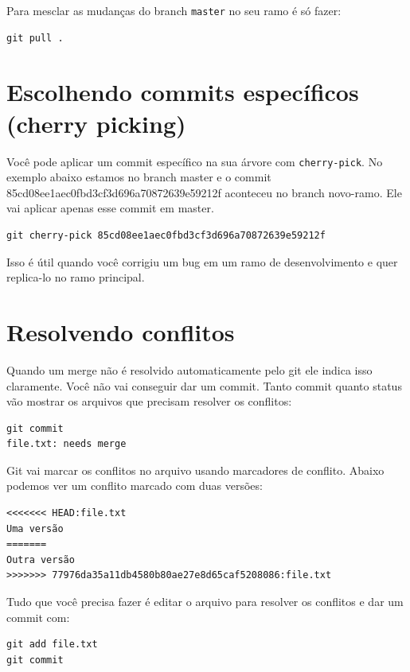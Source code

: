 \documentclass[12pt,brazil]{book}
\begin{document}
Para mesclar as mudanças do branch \texttt{master} no seu ramo é só
fazer:

\begin{verbatim}
git pull .
\end{verbatim}

\section{Escolhendo commits específicos (cherry picking)}
\label{sec:escolh-comm-espec}

Você pode aplicar um commit específico na sua árvore com
\texttt{cherry-pick}. No exemplo abaixo estamos no branch master e o
commit 85cd08ee1aec0fbd3cf3d696a70872639e59212f aconteceu no branch
novo-ramo. Ele vai aplicar apenas esse commit em master.

\begin{verbatim}
git cherry-pick 85cd08ee1aec0fbd3cf3d696a70872639e59212f
\end{verbatim}

Isso é útil quando você corrigiu um bug em um ramo de desenvolvimento
e quer replica-lo no ramo principal.

\section{Resolvendo conflitos}
\label{sec:resolvendo-conflitos}

Quando um merge não é resolvido automaticamente pelo git ele indica
isso claramente. Você não vai conseguir dar um commit. Tanto commit
quanto status vão mostrar os arquivos que precisam resolver os
conflitos:

\begin{verbatim}
git commit
file.txt: needs merge
\end{verbatim}

Git vai marcar os conflitos no arquivo usando marcadores de conflito.
Abaixo podemos ver um conflito marcado com duas versões:

\begin{verbatim}
<<<<<<< HEAD:file.txt
Uma versão
=======
Outra versão
>>>>>>> 77976da35a11db4580b80ae27e8d65caf5208086:file.txt
\end{verbatim}

Tudo que você precisa fazer é editar o arquivo para resolver os
conflitos e dar um commit com:

\begin{verbatim}
git add file.txt
git commit
\end{verbatim}
\end{document}
